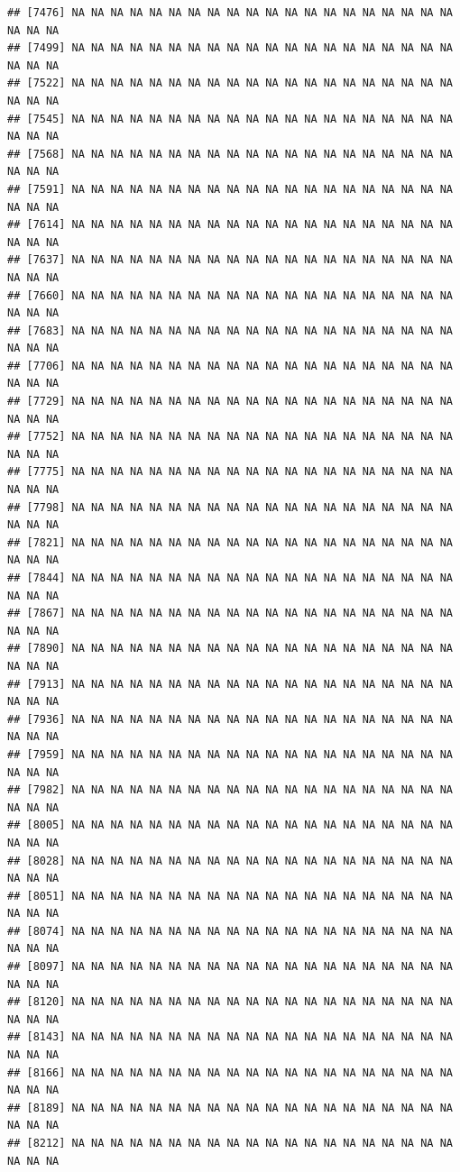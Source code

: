 \documentclass{article}\usepackage[]{graphicx}\usepackage[]{color}
\makeatletter
\newenvironment{kframe}{%
 \def\at@end@of@kframe{}%
 \ifinner\ifhmode%
  \def\at@end@of@kframe{\end{minipage}}%
  \begin{minipage}{\columnwidth}%
 \fi\fi%
 \def\FrameCommand##1{\hskip\@totalleftmargin \hskip-\fboxsep
 \colorbox{shadecolor}{##1}\hskip-\fboxsep
     \hskip-\linewidth \hskip-\@totalleftmargin \hskip\columnwidth}%
 \MakeFramed {\advance\hsize-\width
   \@totalleftmargin\z@ \linewidth\hsize
   \@setminipage}}%
 {\par\unskip\endMakeFramed%
 \at@end@of@kframe}
\newenvironment{knitrout}{}{} %
\makeatother
\begin{document}
\begin{knitrout}
\begin{kframe}
\begin{verbatim}
## [7476] NA NA NA NA NA NA NA NA NA NA NA NA NA NA NA NA NA NA NA NA NA NA NA
## [7499] NA NA NA NA NA NA NA NA NA NA NA NA NA NA NA NA NA NA NA NA NA NA NA
## [7522] NA NA NA NA NA NA NA NA NA NA NA NA NA NA NA NA NA NA NA NA NA NA NA
## [7545] NA NA NA NA NA NA NA NA NA NA NA NA NA NA NA NA NA NA NA NA NA NA NA
## [7568] NA NA NA NA NA NA NA NA NA NA NA NA NA NA NA NA NA NA NA NA NA NA NA
## [7591] NA NA NA NA NA NA NA NA NA NA NA NA NA NA NA NA NA NA NA NA NA NA NA
## [7614] NA NA NA NA NA NA NA NA NA NA NA NA NA NA NA NA NA NA NA NA NA NA NA
## [7637] NA NA NA NA NA NA NA NA NA NA NA NA NA NA NA NA NA NA NA NA NA NA NA
## [7660] NA NA NA NA NA NA NA NA NA NA NA NA NA NA NA NA NA NA NA NA NA NA NA
## [7683] NA NA NA NA NA NA NA NA NA NA NA NA NA NA NA NA NA NA NA NA NA NA NA
## [7706] NA NA NA NA NA NA NA NA NA NA NA NA NA NA NA NA NA NA NA NA NA NA NA
## [7729] NA NA NA NA NA NA NA NA NA NA NA NA NA NA NA NA NA NA NA NA NA NA NA
## [7752] NA NA NA NA NA NA NA NA NA NA NA NA NA NA NA NA NA NA NA NA NA NA NA
## [7775] NA NA NA NA NA NA NA NA NA NA NA NA NA NA NA NA NA NA NA NA NA NA NA
## [7798] NA NA NA NA NA NA NA NA NA NA NA NA NA NA NA NA NA NA NA NA NA NA NA
## [7821] NA NA NA NA NA NA NA NA NA NA NA NA NA NA NA NA NA NA NA NA NA NA NA
## [7844] NA NA NA NA NA NA NA NA NA NA NA NA NA NA NA NA NA NA NA NA NA NA NA
## [7867] NA NA NA NA NA NA NA NA NA NA NA NA NA NA NA NA NA NA NA NA NA NA NA
## [7890] NA NA NA NA NA NA NA NA NA NA NA NA NA NA NA NA NA NA NA NA NA NA NA
## [7913] NA NA NA NA NA NA NA NA NA NA NA NA NA NA NA NA NA NA NA NA NA NA NA
## [7936] NA NA NA NA NA NA NA NA NA NA NA NA NA NA NA NA NA NA NA NA NA NA NA
## [7959] NA NA NA NA NA NA NA NA NA NA NA NA NA NA NA NA NA NA NA NA NA NA NA
## [7982] NA NA NA NA NA NA NA NA NA NA NA NA NA NA NA NA NA NA NA NA NA NA NA
## [8005] NA NA NA NA NA NA NA NA NA NA NA NA NA NA NA NA NA NA NA NA NA NA NA
## [8028] NA NA NA NA NA NA NA NA NA NA NA NA NA NA NA NA NA NA NA NA NA NA NA
## [8051] NA NA NA NA NA NA NA NA NA NA NA NA NA NA NA NA NA NA NA NA NA NA NA
## [8074] NA NA NA NA NA NA NA NA NA NA NA NA NA NA NA NA NA NA NA NA NA NA NA
## [8097] NA NA NA NA NA NA NA NA NA NA NA NA NA NA NA NA NA NA NA NA NA NA NA
## [8120] NA NA NA NA NA NA NA NA NA NA NA NA NA NA NA NA NA NA NA NA NA NA NA
## [8143] NA NA NA NA NA NA NA NA NA NA NA NA NA NA NA NA NA NA NA NA NA NA NA
## [8166] NA NA NA NA NA NA NA NA NA NA NA NA NA NA NA NA NA NA NA NA NA NA NA
## [8189] NA NA NA NA NA NA NA NA NA NA NA NA NA NA NA NA NA NA NA NA NA NA NA
## [8212] NA NA NA NA NA NA NA NA NA NA NA NA NA NA NA NA NA NA NA NA NA NA NA

\end{verbatim}
\end{kframe}
\end{knitrout}
\end{document}
